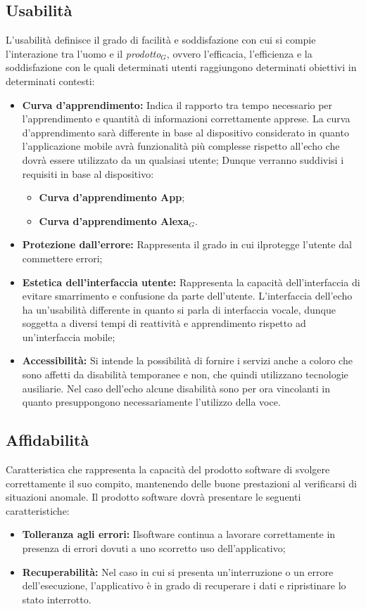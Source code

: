 \subsection{Usabilità}
L'usabilità definisce il grado di facilità e soddisfazione con cui si compie l'interazione tra l'uomo e il \textit{prodotto$_{G}$}, ovvero l'efficacia, l'efficienza e la soddisfazione con le quali determinati utenti raggiungono determinati obiettivi in determinati contesti:
\begin{itemize}
	\item \textbf{Curva d'apprendimento:} Indica il rapporto tra tempo necessario per l'apprendimento e quantità di informazioni correttamente apprese.
	La curva d'apprendimento sarà differente in base al dispositivo considerato in quanto l'applicazione mobile avrà funzionalità più complesse rispetto all'echo che dovrà essere utilizzato da un qualsiasi utente; Dunque verranno suddivisi i requisiti in base al dispositivo:
	\begin{itemize}
		\item \textbf{Curva d'apprendimento App};
		\item \textbf{Curva d'apprendimento Alexa$_{G}$}.
	\end{itemize}
	\item \textbf{Protezione dall'errore:} Rappresenta il grado in cui ilprotegge l'utente dal commettere errori;
	\item \textbf{Estetica dell'interfaccia utente:} Rappresenta la capacità dell'interfaccia di evitare smarrimento e confusione da parte dell'utente.
	L'interfaccia dell'echo ha un'usabilità differente in quanto si parla di interfaccia vocale, dunque soggetta a diversi tempi di reattività e apprendimento rispetto ad un'interfaccia mobile;
	\item \textbf{Accessibilità:} Si intende la possibilità di fornire i servizi anche a coloro che sono affetti da disabilità temporanee e non, che quindi utilizzano tecnologie ausiliarie.
	Nel caso dell'echo alcune disabilità sono per ora vincolanti in quanto presuppongono necessariamente l'utilizzo della voce.
\end{itemize}
\subsection{Affidabilità}
Caratteristica che rappresenta la capacità del prodotto software di svolgere correttamente il suo compito, mantenendo delle buone prestazioni al verificarsi di situazioni anomale. 
Il prodotto software dovrà presentare le seguenti caratteristiche:
\begin{itemize}
	\item \textbf{Tolleranza agli errori:} Ilsoftware continua a lavorare correttamente in presenza di errori dovuti a uno scorretto uso dell'applicativo;
	\item \textbf{Recuperabilità:} Nel caso in cui si presenta un'interruzione  o un errore dell'esecuzione, l'applicativo è in grado di recuperare i dati e ripristinare lo stato interrotto.
\end{itemize}
